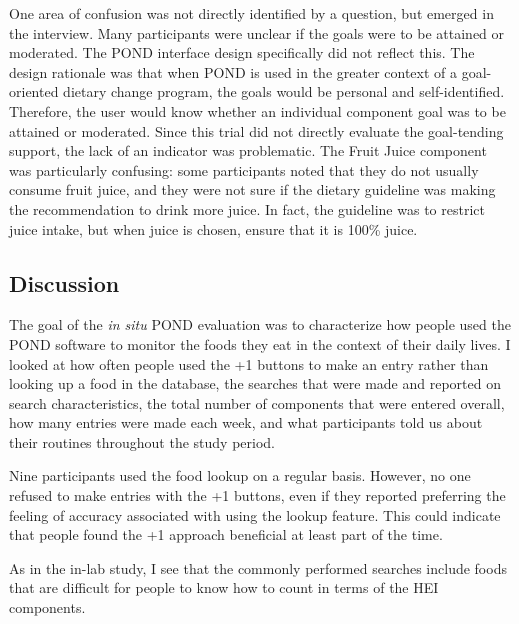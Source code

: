One area of confusion was not directly identified by a question, but emerged in the interview. 
Many participants were unclear if the goals were to be attained or moderated. The POND interface design specifically did not reflect this. The design rationale was that when POND is used in the greater context of a goal-oriented dietary change program, the goals would be personal and self-identified. Therefore, the user would know whether an individual component goal was to be attained or moderated. Since this trial did not directly evaluate the goal-tending support, the lack of an indicator was problematic. The Fruit Juice component was particularly confusing: some participants noted that they do not usually consume fruit juice, and they were not sure if the dietary guideline was making the recommendation to drink more juice. In fact, the guideline was to restrict juice intake, but when juice is chosen, ensure that it is 100\% juice. 


\subsection{Discussion}
The goal of the \textit{in situ} POND evaluation was to characterize how people used the POND software to monitor the foods they eat in the context of their daily lives. I looked at how often people used the +1 buttons to make an entry rather than looking up a food in the database, the searches that were made and reported on search characteristics, the total number of components that were entered overall, how many entries were made each week, and what participants told us about their routines throughout the study period. 

Nine participants used the food lookup on a regular basis. However, no one refused to make entries with the +1 buttons, even if they reported preferring the feeling of accuracy associated with using the lookup feature. This could indicate that people found the +1 approach beneficial at least part of the time. 

As in the in-lab study, I see that the commonly performed searches include foods that are difficult for people to know how to count in terms of the HEI components. 


